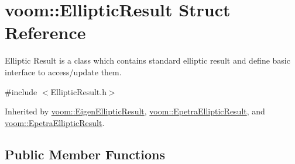 \hypertarget{structvoom_1_1_elliptic_result}{
\section{voom::EllipticResult Struct Reference}
\label{structvoom_1_1_elliptic_result}
}


Elliptic Result is a class which contains standard elliptic result and define basic interface to access/update them.  


{\ttfamily \#include $<$EllipticResult.h$>$}

Inherited by \hyperlink{structvoom_1_1_eigen_elliptic_result}{voom::EigenEllipticResult}, \hyperlink{structvoom_1_1_epetra_elliptic_result}{voom::EpetraEllipticResult}, and \hyperlink{structvoom_1_1_epetra_elliptic_result}{voom::EpetraEllipticResult}.\subsection*{Public Member Functions}
